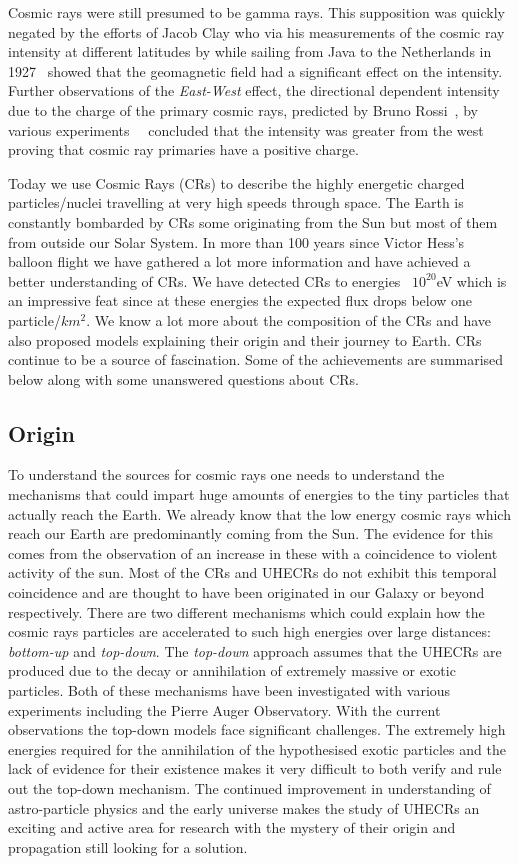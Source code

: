 Cosmic rays were still presumed to be gamma rays. This supposition was quickly negated by the efforts of Jacob Clay who via his measurements of the cosmic ray intensity at different latitudes by while sailing from Java to the Netherlands in 1927~\cite{} showed that the geomagnetic field had a significant effect on the intensity. Further observations of the \textit{East-West} effect, the directional dependent intensity due to the charge of the primary cosmic rays, predicted by Bruno Rossi~\cite{}, by various experiments~\cite{}~\cite{} concluded that the intensity was greater from the west proving that cosmic ray primaries have a positive charge.

Today we use Cosmic Rays (CRs) to describe the highly energetic charged particles/nuclei travelling at very high speeds through space. The Earth is constantly bombarded by CRs some originating from the Sun but most of them from outside our Solar System. In more than 100 years since Victor Hess's balloon flight we have gathered a lot more information and have achieved a better understanding of CRs. We have detected CRs to energies ~$10^{20}$eV which is an impressive feat since at these energies the expected flux drops below one particle/$km^2$. We know a lot more about the composition of the CRs and have also proposed models explaining their origin and their journey to Earth. CRs continue to be a source of fascination. Some of the achievements are summarised below along with some unanswered questions about CRs. 

\subsection{Origin}
\label{subsec:crorig}
To understand the sources for cosmic rays one needs to understand the mechanisms that could impart huge amounts of energies to the tiny particles that actually reach the Earth. We already know that the low energy cosmic rays which reach our Earth are predominantly coming from the Sun. The evidence for this comes from the observation of an increase in these with a coincidence to violent activity of the sun. Most of the CRs and UHECRs do not exhibit this temporal coincidence and are thought to have been originated in our Galaxy or beyond respectively. There are two different mechanisms which could explain how the cosmic rays particles are accelerated to such high energies over large distances: \textit{bottom-up} and \textit{top-down}. The \textit{top-down} approach assumes that the UHECRs are produced due to the decay or annihilation of extremely massive or exotic particles.
Both of these mechanisms have been investigated with various experiments including the Pierre Auger Observatory. With the current observations the top-down models face significant challenges. The extremely high energies required for the annihilation of the hypothesised exotic particles and the lack of evidence for their existence makes it very difficult to both verify and rule out the top-down mechanism. The continued improvement in understanding of astro-particle physics and the early universe makes the study of UHECRs an exciting and active area for research with the mystery of their origin and propagation still looking for a solution. 

